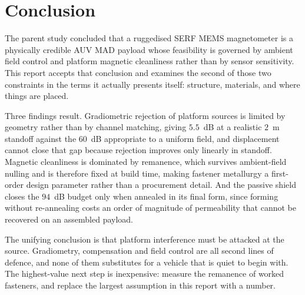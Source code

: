 \documentclass[11pt]{article}
\begin{document}
\section{Conclusion}
The parent study concluded that a ruggedised SERF MEMS magnetometer is a
physically credible AUV MAD payload whose feasibility is governed by ambient
field control and platform magnetic cleanliness rather than by sensor
sensitivity. This report accepts that conclusion and examines the second of those
two constraints in the terms it actually presents itself: structure, materials,
and where things are placed.

Three findings result. Gradiometric rejection of platform sources is limited by
geometry rather than by channel matching, giving $5.5$~dB at a realistic $2$~m
standoff against the $60$~dB appropriate to a uniform field, and displacement
cannot close that gap because rejection improves only linearly in standoff.
Magnetic cleanliness is dominated by remanence, which survives ambient-field
nulling and is therefore fixed at build time, making fastener metallurgy a
first-order design parameter rather than a procurement detail. And the passive
shield closes the $94$~dB budget only when annealed in its final form, since
forming without re-annealing costs an order of magnitude of permeability that
cannot be recovered on an assembled payload.

The unifying conclusion is that platform interference must be attacked at the
source. Gradiometry, compensation and field control are all second lines of
defence, and none of them substitutes for a vehicle that is quiet to begin with.
The highest-value next step is inexpensive: measure the remanence of worked
fasteners, and replace the largest assumption in this report with a number.
\end{document}
